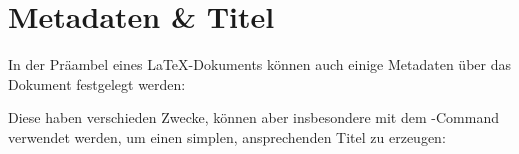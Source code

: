 \section{Metadaten \& Titel}
In der Präambel eines \LaTeX{}-Dokuments können auch einige Metadaten über das Dokument festgelegt werden:
Diese haben verschieden Zwecke, können aber insbesondere mit dem -Command verwendet werden, um einen simplen, ansprechenden Titel zu erzeugen:

